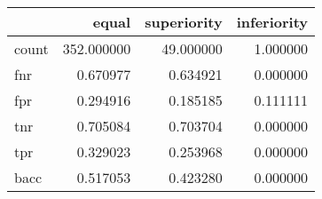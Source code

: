 \begin{tabular}{lrrr}
\toprule
{} &       equal &  superiority &  inferiority \\
\midrule
count &  352.000000 &    49.000000 &     1.000000 \\
fnr   &    0.670977 &     0.634921 &     0.000000 \\
fpr   &    0.294916 &     0.185185 &     0.111111 \\
tnr   &    0.705084 &     0.703704 &     0.000000 \\
tpr   &    0.329023 &     0.253968 &     0.000000 \\
bacc  &    0.517053 &     0.423280 &     0.000000 \\
\bottomrule
\end{tabular}
